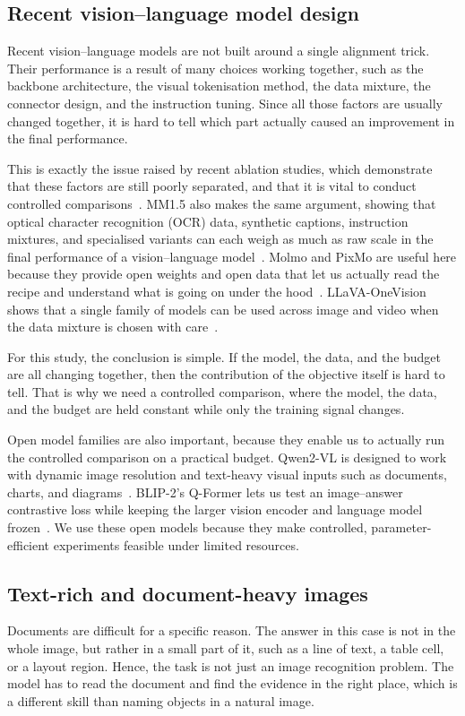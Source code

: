 \documentclass[preprint,12pt]{elsarticle}
\begin{document}
\subsection{Recent vision--language model design}
Recent vision--language models are not built around a single alignment trick.
Their performance is a result of many choices working together, such as the backbone architecture,
the visual tokenisation method, the data mixture, the connector design, and the instruction tuning.
Since all those factors are usually changed together, it is hard to tell which part actually caused an improvement in the final performance.

This is exactly the issue raised by recent ablation studies, 
which demonstrate that these factors are still poorly separated, and that it is vital to conduct controlled comparisons~\cite{laurencon2024whatmatters}.
MM1.5 also makes the same argument, showing that optical character recognition (OCR) data,
synthetic captions, instruction mixtures, and specialised variants 
can each weigh as much as raw scale in the final performance of a vision--language model~\cite{zhang2025mm15}.
Molmo and PixMo are useful here because they provide open weights and open data 
that let us actually read the recipe and understand what is going on under the hood~\cite{deitke2025molmo}.
LLaVA-OneVision shows that a single family of models can be used across image and video when the data mixture is chosen with care~\cite{li2025llavaonevision}.

For this study, the conclusion is simple.
If the model, the data, and the budget are all changing together, then the contribution of the objective itself is hard to tell.
That is why we need a controlled comparison, where the model, the data, and the budget are held constant while only the training signal changes.

Open model families are also important, because they enable us to actually run the controlled comparison on a practical budget.
Qwen2-VL is designed to work with dynamic image resolution and text-heavy visual inputs such as documents, charts, and diagrams~\cite{wang2024qwen2vl}.
BLIP-2's Q-Former lets us test an image--answer contrastive loss while keeping the larger vision encoder and language model frozen~\cite{li2023blip2}.
We use these open models because they make controlled, parameter-efficient experiments feasible under limited resources.

\subsection{Text-rich and document-heavy images}
Documents are difficult for a specific reason.
The answer in this case is not in the whole image, but rather in a small part of it, such as a line of text, a table cell, or a layout region.
Hence, the task is not just an image recognition problem.
The model has to read the document and find the evidence in the right place, which is a different skill than naming objects in a natural image.
\end{document}
